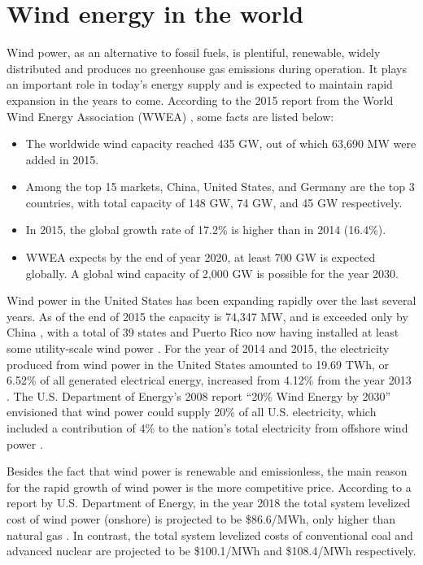 \documentclass{umthesis}
\begin{document}
\section{Wind energy in the world}
Wind power, as an alternative to fossil fuels, is plentiful, renewable, widely distributed and produces no greenhouse gas emissions during operation. It plays an important role in today's energy supply and is expected to maintain rapid expansion in the years to come. According to the 2015 report from the World Wind Energy Association (WWEA) \cite{WWEA_a}, some facts are listed below:

\begin{itemize}
  \item The worldwide wind capacity reached 435 GW, out of which 63,690 MW were added in 2015.
  \item Among the top 15 markets, China, United States, and Germany are the top 3 countries, with total capacity of 148 GW, 74 GW, and 45 GW respectively.
  \item In 2015, the global growth rate of 17.2\% is higher than in 2014 (16.4\%). 
  \item WWEA expects by the end of year 2020, at least 700 GW is expected globally. A global wind capacity of 2,000 GW is possible for the year 2030.
\end{itemize}

Wind power in the United States has been expanding rapidly over the last several years. As of the end of 2015 the capacity is 74,347 MW, and is exceeded only by China \cite{WWEA_a}, with a total of 39 states and Puerto Rico now having installed at least some utility-scale wind power \cite{AWEA}. For the year of 2014 and 2015, the electricity produced from wind power in the United States amounted to 19.69 TWh, or 6.52\% of all generated electrical energy, increased from 4.12\% from the year 2013 \cite{EPM}. The U.S. Department of Energy's 2008 report ``20\% Wind Energy by 2030'' envisioned that wind power could supply 20\% of all U.S. electricity, which included a contribution of 4\% to the nation's total electricity from offshore wind power \cite{thirty_by_twenty}. 

Besides the fact that wind power is renewable and emissionless, the main reason for the rapid growth of wind power is the more competitive price. According to a report by U.S. Department of Energy, in the year 2018 the total system levelized cost of wind power (onshore) is projected to be \$86.6/MWh, only higher than natural gas \cite{energy_cost}. In contrast, the total system levelized costs of conventional coal and advanced nuclear are projected to be \$100.1/MWh and \$108.4/MWh respectively.
\end{document}

